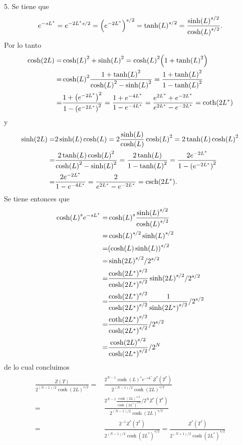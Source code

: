 \documentclass{article}
\begin{document}
5. Se tiene que 
\begin{equation}
e^{-sL^*}=e^{-2L^*s/2}=\qty(e^{-2L^*})^{s/2}=\tanh(L)^{s/2}=\frac{\sinh(L)^{s/2}}{\cosh(L)^{s/2}}.
\end{equation}
Por lo tanto
\begin{align}
\begin{split}
\cosh(2L)=&\cosh(L)^2+\sinh(L)^2=\cosh(L)^2\qty(1+\tanh(L)^2)\\
=&\cosh(L)^2\frac{1+\tanh(L)^2}{\cosh(L)^2-\sinh(L)^2}=\frac{1+\tanh(L)^2}{1-\tanh(L)^2}\\
=&\frac{1+\qty(e^{-2L^*})^2}{1-\qty(e^{-2L^*})^2}=\frac{1+e^{-4L^*}}{1-e^{-4L^*}}=\frac{e^{2L^*}+e^{-2L^*}}{e^{2L^*}-e^{-2L^*}}=\coth(2L^*)
\end{split}
\end{align}
y
\begin{align}
\begin{split}\label{ec:temperatura_dual}
\sinh(2L)=&2\sinh(L)\cosh(L)=2\frac{\sinh(L)}{\cosh(L)}\cosh(L)^2=2\tanh(L)\cosh(L)^2\\
=&\frac{2\tanh(L)\cosh(L)^2}{\cosh(L)^2-\sinh(L)^2}=\frac{2\tanh(L)}{1-\tanh(L)^2}=\frac{2e^{-2L^*}}{1-\qty(e^{-2L^*})^2}\\
=&\frac{2e^{-2L^*}}{1-e^{-4L^*}}=\frac{2}{e^{2L^*}-e^{-2L^*}}=\csch(2L^*).
\end{split}
\end{align}
Se tiene entonces que
\begin{align}
\begin{split}
\cosh(L)^s e^{-sL^*}=&\cosh(L)^s\frac{\sinh(L)^{s/2}}{\cosh(L)^{s/2}}\\
=&\cosh(L)^{s/2}\sinh(L)^{s/2}\\
=&\qty(\cosh(L)\sinh(L))^{s/2}\\
=&\sinh(2L)^{s/2}/2^{s/2}\\
=&\frac{\cosh(2L^*)^{s/2}}{\cosh(2L^*)^{s/2}}\sinh(2L)^{s/2}/2^{s/2}\\
=&\frac{\cosh(2L^*)^{s/2}}{\cosh(2L^*)^{s/2}}\frac{1}{\sinh(2L^*)^{s/2}}/2^{s/2}\\
=&\frac{\coth(2L^*)^{s/2}}{\cosh(2L^*)^{s/2}}/2^{s/2}\\
=&\frac{\cosh(2L)^{s/2}}{\cosh(2L^*)^{s/2}}/2^{N}
\end{split}
\end{align}
de lo cual concluimos
\begin{align}
\begin{split}
\frac{Z(T)}{2^{(N-1)/2}\cosh(2L)^{s/2}}=&\frac{2^{N-1}\cosh(L)^se^{-sL^*}Z^*(T^*)}{2^{(N-1)/2}\cosh(2L)^{s/2}}\\
=&\frac{2^{N-1}\frac{\cosh(2L)^{s/2}}{\cosh(2L^*)^{s/2}}/2^{N}Z^*(T^*)}{2^{(N-1)/2}\cosh(2L)^{s/2}}\\
=&\frac{2^{-1}Z^*(T^*)}{2^{(N-1)/2}\cosh(2L^*)^{s/2}}=\frac{Z^*(T^*)}{2^{(N+1)/2}\cosh(2L^*)^{s/2}}
\end{split}
\end{align}
\end{document}
